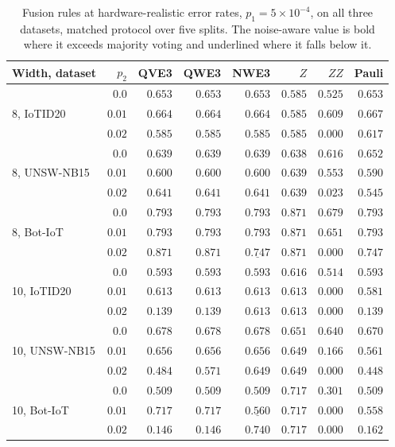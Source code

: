 \begin{table}[t]
\centering
\caption{Fusion rules at hardware-realistic error rates, $p_1 = 5\times10^{-4}$, on all
three datasets, matched protocol over five splits. The noise-aware value is bold where it
exceeds majority voting and underlined where it falls below it.}
\label{tab:fusionrealistic}
\begin{tabular}{@{}lrrrrrrr@{}}
\toprule
Width, dataset & $p_2$ & QVE3 & QWE3 & NWE3 & $Z$ & $ZZ$ & Pauli \\
\midrule
\multirow{3}{*}{8, IoTID20}
 & $0.0$ & $0.653$ & $0.653$ & $0.653$ & $0.585$ & $0.525$ & $0.653$ \\
 & $0.01$ & $0.664$ & $0.664$ & $0.664$ & $0.585$ & $0.609$ & $0.667$ \\
 & $0.02$ & $0.585$ & $0.585$ & $0.585$ & $0.585$ & $0.000$ & $0.617$ \\
\midrule
\multirow{3}{*}{8, UNSW-NB15}
 & $0.0$ & $0.639$ & $0.639$ & $0.639$ & $0.638$ & $0.616$ & $0.652$ \\
 & $0.01$ & $0.600$ & $0.600$ & $0.600$ & $0.639$ & $0.553$ & $0.590$ \\
 & $0.02$ & $0.641$ & $0.641$ & $0.641$ & $0.639$ & $0.023$ & $0.545$ \\
\midrule
\multirow{3}{*}{8, Bot-IoT}
 & $0.0$ & $0.793$ & $0.793$ & $0.793$ & $0.871$ & $0.679$ & $0.793$ \\
 & $0.01$ & $0.793$ & $0.793$ & $0.793$ & $0.871$ & $0.651$ & $0.793$ \\
 & $0.02$ & $0.871$ & $0.871$ & $\underline{0.747}$ & $0.871$ & $0.000$ & $0.747$ \\
\midrule
\multirow{3}{*}{10, IoTID20}
 & $0.0$ & $0.593$ & $0.593$ & $0.593$ & $0.616$ & $0.514$ & $0.593$ \\
 & $0.01$ & $0.613$ & $0.613$ & $0.613$ & $0.613$ & $0.000$ & $0.581$ \\
 & $0.02$ & $0.139$ & $0.139$ & $\mathbf{0.613}$ & $0.613$ & $0.000$ & $0.139$ \\
\midrule
\multirow{3}{*}{10, UNSW-NB15}
 & $0.0$ & $0.678$ & $0.678$ & $0.678$ & $0.651$ & $0.640$ & $0.670$ \\
 & $0.01$ & $0.656$ & $0.656$ & $0.656$ & $0.649$ & $0.166$ & $0.561$ \\
 & $0.02$ & $0.484$ & $0.571$ & $\mathbf{0.649}$ & $0.649$ & $0.000$ & $0.448$ \\
\midrule
\multirow{3}{*}{10, Bot-IoT}
 & $0.0$ & $0.509$ & $0.509$ & $0.509$ & $0.717$ & $0.301$ & $0.509$ \\
 & $0.01$ & $0.717$ & $0.717$ & $\underline{0.560}$ & $0.717$ & $0.000$ & $0.558$ \\
 & $0.02$ & $0.146$ & $0.146$ & $\mathbf{0.740}$ & $0.717$ & $0.000$ & $0.162$ \\
\bottomrule
\end{tabular}
\end{table}
